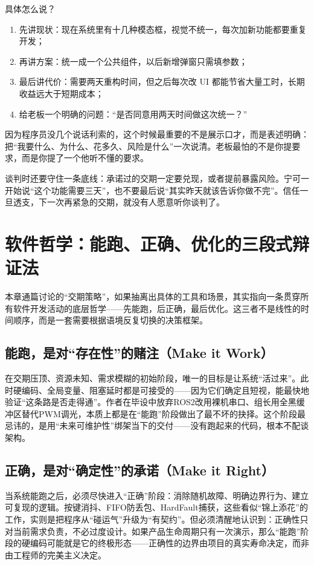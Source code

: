 具体怎么说？

\begin{enumerate}
	\item 先讲现状：现在系统里有十几种模态框，视觉不统一，每次加新功能都要重复开发；
	\item 再讲方案：统一成一个公共组件，以后新增弹窗只需填参数；
	\item 最后讲代价：需要两天重构时间，但之后每次改 UI 都能节省大量工时，长期收益远大于短期成本；
	\item 给老板一个明确的问题：“是否同意用两天时间做这次统一？”
\end{enumerate}

因为程序员没几个说话利索的，这个时候最重要的不是展示口才，而是表述明确：把“我要什么、为什么、花多久、风险是什么”一次说清。老板最怕的不是你提要求，而是你提了一个他听不懂的要求。

谈判时还要守住一条底线：承诺过的交期一定要兑现，或者提前暴露风险。宁可一开始说“这个功能需要三天”，也不要最后说“其实昨天就该告诉你做不完”。信任一旦透支，下一次再紧急的交期，就没有人愿意听你谈判了。

\section{软件哲学：能跑、正确、优化的三段式辩证法}
本章通篇讨论的“交期策略”，如果抽离出具体的工具和场景，其实指向一条贯穿所有软件开发活动的底层哲学——先能跑，后正确，最后优化。这三者不是线性的时间顺序，而是一套需要根据语境反复切换的决策框架。

\subsection{能跑，是对“存在性”的赌注（Make it Work）}
在交期压顶、资源未知、需求模糊的初始阶段，唯一的目标是让系统“活过来”。此时硬编码、全局变量、阻塞延时都是可接受的——因为它们确定且短视，能最快地验证“这条路是否走得通”。作者在毕设中放弃ROS2改用裸机串口、组长用全黑缓冲区替代PWM调光，本质上都是在“能跑”阶段做出了最不坏的抉择。这个阶段最忌讳的，是用“未来可维护性”绑架当下的交付——没有跑起来的代码，根本不配谈架构。

\subsection{正确，是对“确定性”的承诺（Make it Right）}
当系统能跑之后，必须尽快进入“正确”阶段：消除随机故障、明确边界行为、建立可复现的逻辑。按键消抖、FIFO防丢包、HardFault捕获，这些看似“锦上添花”的工作，实则是把程序从“碰运气”升级为“有契约”。但必须清醒地认识到：正确性只对当前需求负责，不必过度设计。如果产品生命周期只有一次演示，那么“能跑”阶段的硬编码可能就是它的终极形态——正确性的边界由项目的真实寿命决定，而非由工程师的完美主义决定。

